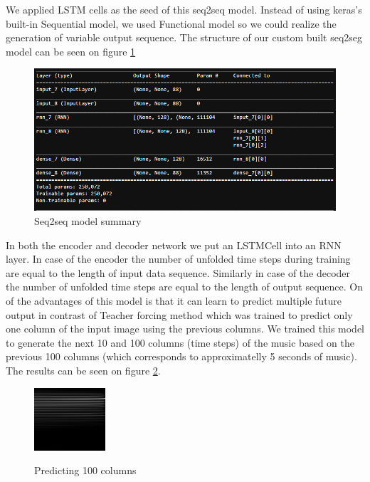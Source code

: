 \documentclass{article}
\begin{document}
We applied LSTM cells as the seed of this seq2seq model. Instead of using keras's built-in Sequential model, we used Functional model so we could realize the generation of variable output sequence. The structure of our custom built seq2seg model can be seen on figure \ref{fig:seq2seqsummary}
\begin{figure}[!htb]
	\centering
	\includegraphics[width=\linewidth]{seq2seqsummary.png}
	\caption{Seq2seq model summary}
	\label{fig:seq2seqsummary}
\end{figure}
In both the encoder and decoder network we put an LSTMCell into an RNN layer. In case of the encoder the number of unfolded time steps during training are equal to the length of input data sequence. Similarly in case of the decoder the number of unfolded time steps are equal to the length of output sequence.
On of the advantages of this model is that it can learn to predict multiple future output in contrast of Teacher forcing method which was trained to predict only one column of the input image using the previous columns. 
We trained this model to generate the next 10 and 100 columns (time steps) of the music based on the previous 100 columns (which corresponds to approximatelly 5 seconds of music). The results can be seen on figure \ref{fig:seq2seqresult1}.

\begin{figure}[!htb]
	\centering
	\caption{Predicting 100 columns}{
		\includegraphics[width=0.48\linewidth]{seq2seqresult1.png}}
	\label{fig:seq2seqresult1}
\end{figure}
\end{document}
